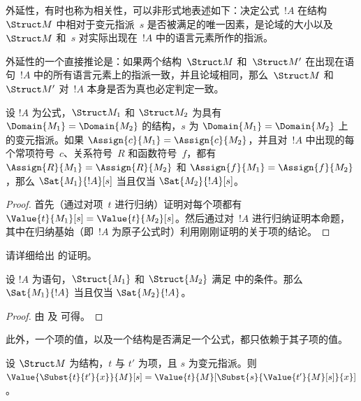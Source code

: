 \documentclass[../../../include/open-logic-section]{subfiles}
\begin{document}


\begin{explain}
外延性，有时也称为相关性，可以非形式地表述如下：决定公式~$!A$ 在结构~$\Struct M$ 中相对于变元指派~$s$ 是否被满足的唯一因素，是论域的大小以及~$\Struct M$ 和~$s$ 对实际出现在~$!A$ 中的语言元素所作的指派。

外延性的一个直接推论是：如果两个结构~$\Struct M$ 和~$\Struct M'$ 在出现在语句~$!A$ 中的所有语言元素上的指派一致，并且论域相同，那么~$\Struct M$ 和~$\Struct M'$ 对~$!A$ 本身是否为真也必定判定一致。
\end{explain}

\begin{prop}[外延性]
  设 $!A$ 为公式，$\Struct M_1$ 和 $\Struct M_2$ 为具有 $\Domain{M_1} = \Domain{M_2}$ 的结构，$s$ 为 $\Domain{M_1} = \Domain{M_2}$ 上的变元指派。如果 $\Assign{c}{M_1} = \Assign{c}{M_2}$，并且对~$!A$ 中出现的每个常项符号~$c$、关系符号~$R$ 和函数符号~$f$，都有 $\Assign{R}{M_1}=\Assign{R}{M_2}$ 和 $\Assign{f}{M_1} = \Assign{f}{M_2}$，那么 $\Sat{M_1}{!A}[s]$ 当且仅当 $\Sat{M_2}{!A}[s]$。
\end{prop}

\begin{proof}
  首先（通过对项~$t$ 进行归纳）证明对每个项都有 $\Value{t}{M_1}[s] = \Value{t}{M_2}[s]$。然后通过对~$!A$ 进行归纳证明本命题，其中在归纳基始（即~$!A$ 为原子公式时）利用刚刚证明的关于项的结论。
\end{proof}

\begin{prob}
请详细给出  的证明。
\end{prob}

\begin{cor}[语句的外延性]
  设 $!A$ 为语句，$\Struct{M_1}$ 和 $\Struct{M_2}$ 满足  中的条件。那么 $\Sat{M_1}{!A}$ 当且仅当 $\Sat{M_2}{!A}$。
\end{cor}

\begin{proof}
由  及  可得。
\end{proof}

此外，一个项的值，以及一个结构是否满足一个公式，都只依赖于其子项的值。

\begin{prop}
设 $\Struct M$ 为结构，$t$ 与 $t'$ 为项，且 $s$ 为变元指派。则 $\Value{\Subst{t}{t'}{x}}{M}[s] =
\Value{t}{M}[\Subst{s}{\Value{t'}{M}[s]}{x}]$。
\end{prop}
\end{document}
